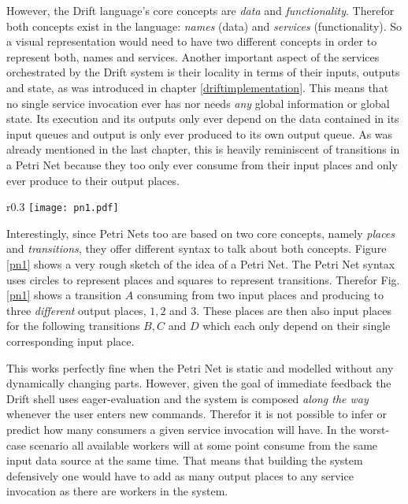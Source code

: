 However, the Drift language's core concepts are \textit{data}
and \textit{functionality}. Therefor both concepts exist in
the language: \textit{names} (data) and \textit{services}
(functionality). So a visual representation would need to
have two different concepts in order to represent both, names
and services.
Another important aspect of the services orchestrated by the
Drift system is their locality in terms of their inputs, outputs and
state, as was introduced in chapter
\ref{driftimplementation}. This means that no single service
invocation ever has nor needs \textit{any} global information
or global state. Its execution and its outputs only ever depend
on the data contained in its input queues and output is only
ever produced to its own output queue. As was already mentioned
in the last chapter, this is heavily reminiscent of transitions
in a Petri Net because they too only ever consume from their
input places and only ever produce to their output places.

\begin{wrapfigure}{r}{0.3\textwidth}
  \texttt{[image: pn1.pdf]}
  \caption{Rough sketch example of a Petri Net.}
  \label{pn1}
\end{wrapfigure}

Interestingly, since Petri Nets too are based on two core concepts,
namely \textit{places} and \textit{transitions}, they offer different
syntax to talk about both concepts. Figure \ref{pn1} shows a very
rough sketch of the idea of a Petri Net. The Petri Net syntax
uses circles to represent places and squares to represent transitions.
Therefor Fig.\ref{pn1} shows a transition $A$ consuming from two
input places and producing to three \textit{different} output places,
$1, 2$ and $3$. These places are then also input places for the
following transitions $B, C$ and $D$ which each only depend
on their single corresponding input place.

This works perfectly fine when the Petri Net is static and modelled
without any dynamically changing parts. However, given the goal
of immediate feedback the Drift shell uses eager-evaluation and
the system is composed \textit{along the way} whenever the user
enters new commands.
Therefor it is not possible to infer or predict how many consumers
a given service invocation will have. In the worst-case scenario
all available workers will at some point consume from the
same input data source at the same time. That means that building the
system defensively one would have to add as many output places to any
service invocation as there are workers in the system.


